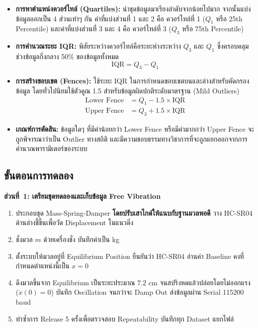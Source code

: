 \begin{itemize}
    \item \textbf{การหาตำแหน่งควอร์ไทล์ (Quartiles):} นำชุดข้อมูลมาเรียงลำดับจากน้อยไปมาก จากนั้นแบ่งข้อมูลออกเป็น 4 ส่วนเท่าๆ กัน ค่าที่แบ่งส่วนที่ 1 และ 2 คือ ควอร์ไทล์ที่ 1 ($Q_1$ หรือ 25th Percentile) และค่าที่แบ่งส่วนที่ 3 และ 4 คือ ควอร์ไทล์ที่ 3 ($Q_3$ หรือ 75th Percentile)
    \item \textbf{การคำนวณระยะ IQR:} พิสัยระหว่างควอร์ไทล์คือระยะห่างระหว่าง $Q_3$ และ $Q_1$ ซึ่งครอบคลุมช่วงข้อมูลกึ่งกลาง 50\% ของข้อมูลทั้งหมด
    \begin{equation}
        \text{IQR} = Q_3 - Q_1
        \label{eq:iqr_calc}
    \end{equation}
    \item \textbf{การสร้างขอบเขต (Fences):} ใช้ระยะ IQR ในการกำหนดขอบเขตบนและล่างสำหรับคัดกรองข้อมูล โดยทั่วไปนิยมใช้ตัวคูณ 1.5 สำหรับข้อมูลผิดปกติระดับมาตรฐาน (Mild Outliers) 
    \begin{align}
        \text{Lower Fence} &= Q_1 - 1.5 \times \text{IQR} \label{eq:lower_fence} \\
        \text{Upper Fence} &= Q_3 + 1.5 \times \text{IQR} \label{eq:upper_fence}
    \end{align}
    \item \textbf{เกณฑ์การตัดสิน:} ข้อมูลใดๆ ที่มีค่าน้อยกว่า Lower Fence หรือมีค่ามากกว่า Upper Fence จะถูกพิจารณาว่าเป็น Outlier ทางสถิติ และมีความชอบธรรมทางวิชาการที่จะถูกแยกออกจากการคำนวณพารามิเตอร์ของระบบ
\end{itemize}

\subsection{ขั้นตอนการทดลอง}

\textbf{ส่วนที่~1: เตรียมชุดทดลองและเก็บข้อมูล Free Vibration}

\begin{enumerate}
    \item ประกอบชุด Mass-Spring-Damper \textbf{โดยปรับเสาไกด์ให้แนบกับฐานมวลพอดี} วาง HC-SR04 ด้านล่างชี้ขึ้นเพื่อวัด Displacement ในแนวดิ่ง
    \item ชั่งมวล $m$ ด้วยเครื่องชั่ง บันทึกค่าเป็น kg
    \item ตั้งระบบให้มวลอยู่ที่ Equilibrium Position ยืนยันว่า HC-SR04 อ่านค่า Baseline คงที่ กำหนดตำแหน่งนี้เป็น $x = 0$
    \item ดึงมวลขึ้นจาก Equilibrium เป็นระยะประมาณ 7.2 cm จนสปริงหดแล้วปล่อยโดยไม่ออกแรง ($\dot{x}(0) = 0$) บันทึก Oscillation จนกว่าจะ Damp Out ส่งข้อมูลผ่าน Serial 115200 baud
    \item ทำซ้ำการ Release 5 ครั้งเพื่อตรวจสอบ Repeatability บันทึกทุก Dataset แยกไฟล์
\end{enumerate}

